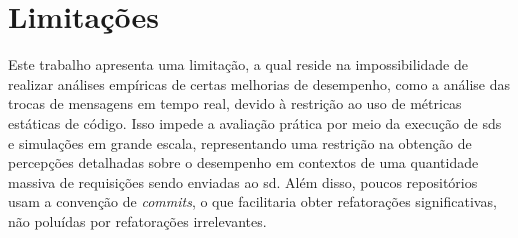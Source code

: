 \section{Limitações}
\label{sec:limitacoes}

Este trabalho apresenta uma limitação, a qual reside na impossibilidade de realizar análises empíricas de certas melhorias de desempenho, como a análise das trocas de mensagens em tempo real, devido à restrição ao uso de métricas estáticas de código. Isso impede a avaliação prática por meio da execução de \gls{sds} e simulações em grande escala, representando uma restrição na obtenção de percepções detalhadas sobre o desempenho em contextos de uma quantidade massiva de requisições sendo enviadas ao \gls{sd}. Além disso, poucos repositórios usam a convenção de \textit{commits}, o que facilitaria obter refatorações significativas, não poluídas por refatorações irrelevantes\cite{conventionalcommits}.
